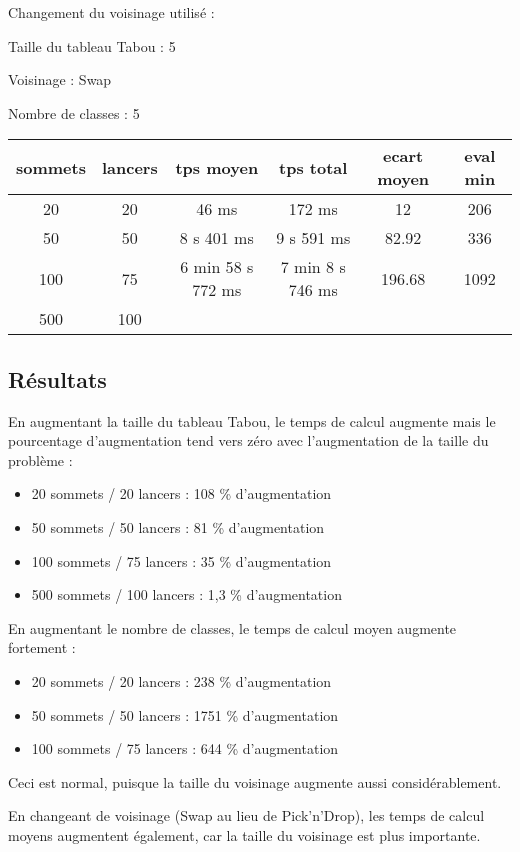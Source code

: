 \documentclass[12pt]{article}
\begin{document}
Changement du voisinage utilisé :

Taille du tableau Tabou : 5

Voisinage : Swap

Nombre de classes : 5
\bigskip

\begin{tabular}{|c|c|c|c|c|c|}
	\hline 
	sommets & lancers & tps moyen & tps total & ecart moyen & eval min\\
	\hline
	20 & 20 & 46 ms & 172  ms & 12 & 206 \\
	\hline
	 50  &  50  &   8 s 401  ms   &  9  s 591   ms   &  82.92   &   336  \\
	\hline
	 100  &  75  & 6 min 58 s 772    ms  & 7 min 8 s 746   ms   &  196.68   &   1092 \\
	\hline
	 500  &  100  &    &   &   &  \\
	\hline
\end{tabular}

\subsection{Résultats}

En augmentant la taille du tableau Tabou, le temps de calcul augmente mais le pourcentage d'augmentation tend vers zéro avec l'augmentation de la taille du problème :
\begin{itemize}
\item 20 sommets / 20 lancers : 108 \% d'augmentation
\item 50 sommets / 50 lancers : 81 \% d'augmentation
\item 100 sommets / 75 lancers : 35 \% d'augmentation
\item 500 sommets / 100 lancers : 1,3 \% d'augmentation
\end{itemize}
\bigskip

En augmentant le nombre de classes, le temps de calcul moyen augmente fortement :
\begin{itemize}
\item 20 sommets / 20 lancers : 238 \% d'augmentation
\item 50 sommets / 50 lancers : 1751 \% d'augmentation
\item 100 sommets / 75 lancers : 644 \% d'augmentation
\end{itemize}
Ceci est normal, puisque la taille du voisinage augmente aussi considérablement.
\bigskip 

En changeant de voisinage (Swap au lieu de Pick'n'Drop), les temps de calcul moyens augmentent également, car la taille du voisinage est plus importante.
\end{document}
